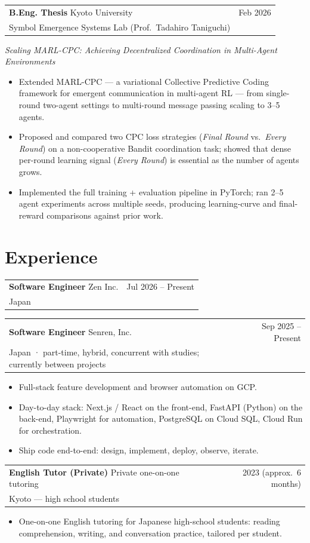 \documentclass[11pt,a4paper]{article}
\makeatletter
\newcommand{\role}[4]{%
  \noindent
  \begin{tabular*}{\linewidth}{@{\extracolsep{\fill}}l r}
    \textbf{#1} \textcolor{muted}{\textbar{}} #2 & \textcolor{muted}{#3}\\[-1pt]
    \textcolor{muted}{\small #4} &
  \end{tabular*}\par\vspace{-2pt}
}
\newenvironment{bullets}
  {\begin{itemize}[leftmargin=1.1em, itemsep=1pt, parsep=0pt, topsep=2pt]}
  {\end{itemize}}
\makeatother
\begin{document}
\role
  {B.Eng. Thesis}
  {Kyoto University}
  {Feb 2026}
  {Symbol Emergence Systems Lab (Prof.\ Tadahiro Taniguchi)}
\textit{Scaling MARL-CPC: Achieving Decentralized Coordination in Multi-Agent Environments}\par
\begin{bullets}
  \item Extended MARL-CPC --- a variational Collective Predictive Coding framework for emergent communication in multi-agent RL --- from single-round two-agent settings to multi-round message passing scaling to 3--5 agents.
  \item Proposed and compared two CPC loss strategies (\textit{Final Round} vs.\ \textit{Every Round}) on a non-cooperative Bandit coordination task; showed that dense per-round learning signal (\textit{Every Round}) is essential as the number of agents grows.
  \item Implemented the full training + evaluation pipeline in PyTorch; ran 2--5 agent experiments across multiple seeds, producing learning-curve and final-reward comparisons against prior work.
\end{bullets}

\section{Experience}

\role
  {Software Engineer}
  {Zen Inc.}
  {Jul 2026 -- Present}
  {Japan}

\role
  {Software Engineer}
  {Senren, Inc.}
  {Sep 2025 -- Present}
  {Japan · part-time, hybrid, concurrent with studies; currently between projects}
\begin{bullets}
  \item Full-stack feature development and browser automation on GCP.
  \item Day-to-day stack: Next.js / React on the front-end, FastAPI (Python) on the back-end, Playwright for automation, PostgreSQL on Cloud SQL, Cloud Run for orchestration.
  \item Ship code end-to-end: design, implement, deploy, observe, iterate.
\end{bullets}

\role
  {English Tutor (Private)}
  {Private one-on-one tutoring}
  {2023 (approx.\ 6 months)}
  {Kyoto --- high school students}
\begin{bullets}
  \item One-on-one English tutoring for Japanese high-school students: reading comprehension, writing, and conversation practice, tailored per student.
\end{bullets}
\end{document}
